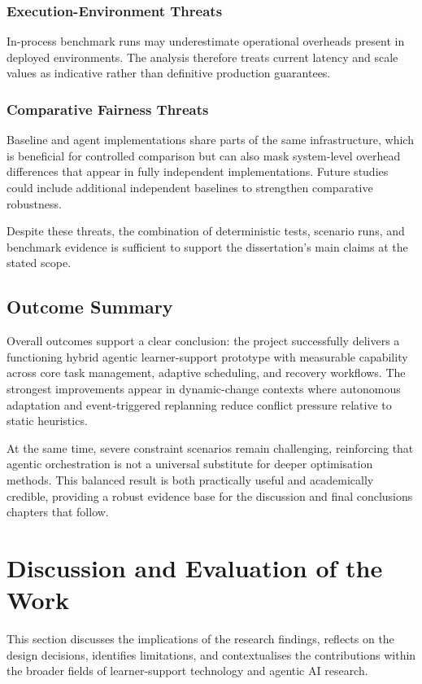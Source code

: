 \documentclass[12pt]{article}
\begin{document}
\subsubsection{Execution-Environment Threats}
In-process benchmark runs may underestimate operational overheads present in deployed environments. The analysis therefore treats current latency and scale values as indicative rather than definitive production guarantees.

\subsubsection{Comparative Fairness Threats}
Baseline and agent implementations share parts of the same infrastructure, which is beneficial for controlled comparison but can also mask system-level overhead differences that appear in fully independent implementations. Future studies could include additional independent baselines to strengthen comparative robustness.

Despite these threats, the combination of deterministic tests, scenario runs, and benchmark evidence is sufficient to support the dissertation's main claims at the stated scope.

\subsection{Outcome Summary}
Overall outcomes support a clear conclusion: the project successfully delivers a functioning hybrid agentic learner-support prototype with measurable capability across core task management, adaptive scheduling, and recovery workflows. The strongest improvements appear in dynamic-change contexts where autonomous adaptation and event-triggered replanning reduce conflict pressure relative to static heuristics.

At the same time, severe constraint scenarios remain challenging, reinforcing that agentic orchestration is not a universal substitute for deeper optimisation methods. This balanced result is both practically useful and academically credible, providing a robust evidence base for the discussion and final conclusions chapters that follow.

\section{Discussion and Evaluation of the Work}
\label{sec:discussion}

This section discusses the implications of the research findings, reflects on the design decisions, identifies limitations, and contextualises the contributions within the broader fields of learner-support technology and agentic AI research.
\end{document}
